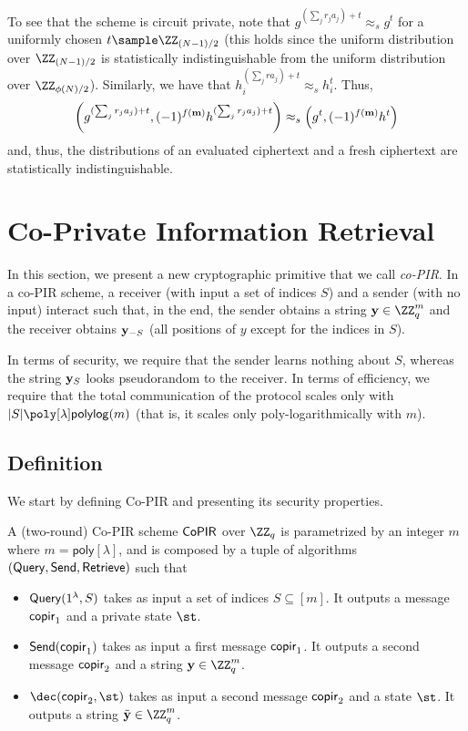 To see that the scheme is circuit private, note that $g^{(\sum_j r_j a_j )+ t}\approx_s g^{t}$ for a uniformly chosen $t\sample \ZZ_{(N-1)/2}$ (this holds since the uniform distribution over $\ZZ_{(N-1)/2}$ is statistically indistinguishable from the uniform distribution over $\ZZ_{\phi(N)/2}$). Similarly, we have that $h_i^{(\sum_j r a_j) +t} \approx_s h_i^t$. Thus, $$\left(g^{(\sum_j r_j a_j) + t},(-1)^{f(\mathbf{m})}h^{(\sum_j r_j a_j) +t}\right)\approx_{s} \left(g^t,(-1)^{f(\mathbf{m})}h^t\right)$$ and, thus, the distributions of an evaluated ciphertext and a fresh ciphertext are statistically indistinguishable.

\section{Co-Private Information Retrieval}
\label{sec:coOT}

In this section, we present a new cryptographic primitive that we call \emph{co-PIR}. In a co-PIR scheme, a receiver (with input a set of indices $S$) and a sender (with no input) interact such that, in the end, the sender obtains a string $\yn\in\ZZ_q^m$ and the receiver obtains  $\mathbf{y}_{-S}$ (all positions of $y$ except for the indices in $S$). 

In terms of security, we require that the sender learns nothing about $S$, whereas  the string $\mathbf{y}_{S}$ looks pseudorandom to the receiver. In terms of efficiency, we require that the total communication of the protocol scales only with $|S|\poly[\lambda]\mathsf{polylog}(m)$ (that is, it scales only poly-logarithmically with  $m$). 



\subsection{Definition}
We start by defining Co-PIR and presenting its security properties.

\begin{definition}[Co-PIR]
A (two-round) Co-PIR  scheme $\mathsf{CoPIR}$ over $\ZZ_q$ is parametrized by an integer $m$ where $m=\mathsf{poly}[\lambda]$, and is composed by a tuple of algorithms $(\mathsf{Query},\mathsf{Send},\mathsf{Retrieve})$ such that
\begin{itemize}
    \item $\mathsf{Query}(1^\lambda,S)$ takes as input a set of indices $S\subseteq [m]$. It outputs a message $\mathsf{copir}_1$ and a private state $\st$.
    \item $\mathsf{Send}(\mathsf{copir}_1)$ takes as input a first message $\mathsf{copir}_1$. It outputs a second message $\mathsf{copir}_2$ and a string $\yn\in\ZZ_q^m$.
    \item $\dec(\copir_2,\st)$ takes as input a second message $\mathsf{copir}_2$ and a state $\st$. It outputs a string $\tilde \yn\in\ZZ_q^{m}$.
\end{itemize}
\end{definition}

